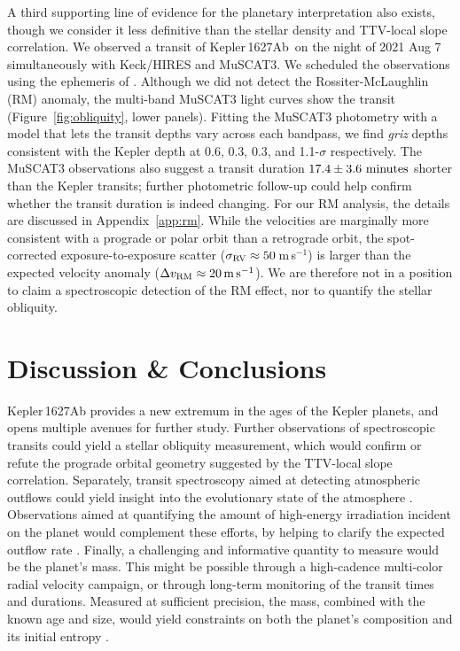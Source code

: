 \documentclass[12pt,modern,twocolumn,tighten]{aastex63}
\newcommand{\pn}{Kepler\,1627Ab} %
\newcommand{\ms}{\,m\,s$^{-1}$}
\begin{document}
A third supporting line of evidence for the planetary interpretation
also exists, though we consider it less definitive than the stellar
density and TTV-local slope correlation.  We observed a transit of
\pn\ on the night of 2021 Aug 7 simultaneously with Keck/HIRES and
MuSCAT3.  We scheduled the observations using the ephemeris of
\citet{holczer_transit_2016}.  Although we did not detect the
Rossiter-McLaughlin (RM) anomaly, the multi-band MuSCAT3 light curves
show the transit (Figure~\ref{fig:obliquity}, lower panels).  Fitting
the MuSCAT3 photometry with a model that lets the transit depths vary
across each bandpass, we find {\it griz} depths consistent with the
Kepler depth at 0.6, 0.3, 0.3, and 1.1-$\sigma$ respectively.  The
MuSCAT3 observations also suggest a transit duration $17.4\pm3.6\ {\rm
minutes}$ shorter than the Kepler transits; further photometric
follow-up could help confirm whether the transit duration is indeed
changing.  For our RM analysis, the details are discussed in
Appendix~\ref{app:rm}.  While the velocities are marginally more
consistent with a prograde or polar orbit than a retrograde orbit, the
spot-corrected exposure-to-exposure scatter ($\sigma_{\rm RV}\approx
50$\ms) is larger than the expected velocity anomaly
($\Delta v_{\rm RM}\approx 20\,{\rm m\,s}^{-1}$).  We are therefore
not in a position to claim a spectroscopic detection of the RM effect,
nor to quantify the stellar obliquity.


\section{Discussion \& Conclusions}
\label{sec:conc}

Kepler\,1627Ab provides a new extremum in the ages of the Kepler
planets, and opens multiple avenues for further study.  Further
observations of spectroscopic transits could yield a stellar obliquity
measurement, which would confirm or refute the prograde orbital
geometry suggested by the TTV-local slope correlation.  Separately,
transit spectroscopy aimed at detecting atmospheric outflows could
yield insight into the evolutionary state of the atmosphere
\citep[{\it
e.g.},][]{ehrenreich_giant_2015,spake_helium_2018,vissapragada_2020}.
Observations aimed at quantifying the amount of high-energy
irradiation incident on the planet would complement these efforts, by
helping to clarify the expected outflow rate \citep[{\it
e.g.},][]{poppenhaeger_2021}.  Finally, a challenging and informative
quantity to measure would be the planet's mass.  This might be
possible through a high-cadence multi-color radial velocity campaign,
or through long-term monitoring of the transit times and durations.
Measured at sufficient precision, the mass, combined with the known
age and size, would yield constraints on both the planet's composition
and its initial entropy \citep{owen_constraining_2020}.
\end{document}
